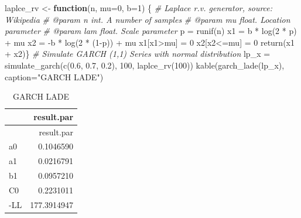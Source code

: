 \documentclass[
  11pt,
]{article}
\newenvironment{Shaded}{\begin{snugshade}}{\end{snugshade}}
\newcommand{\AttributeTok}[1]{\textcolor[rgb]{0.77,0.63,0.00}{#1}}
\newcommand{\CommentTok}[1]{\textcolor[rgb]{0.56,0.35,0.01}{\textit{#1}}}
\newcommand{\ControlFlowTok}[1]{\textcolor[rgb]{0.13,0.29,0.53}{\textbf{#1}}}
\newcommand{\DecValTok}[1]{\textcolor[rgb]{0.00,0.00,0.81}{#1}}
\newcommand{\FloatTok}[1]{\textcolor[rgb]{0.00,0.00,0.81}{#1}}
\newcommand{\FunctionTok}[1]{\textcolor[rgb]{0.00,0.00,0.00}{#1}}
\newcommand{\NormalTok}[1]{#1}
\newcommand{\OtherTok}[1]{\textcolor[rgb]{0.56,0.35,0.01}{#1}}
\newcommand{\SpecialCharTok}[1]{\textcolor[rgb]{0.00,0.00,0.00}{#1}}
\newcommand{\StringTok}[1]{\textcolor[rgb]{0.31,0.60,0.02}{#1}}
\begin{document}
\begin{Shaded}
\begin{Highlighting}[]
\NormalTok{laplce\_rv }\OtherTok{\textless{}{-}} \ControlFlowTok{function}\NormalTok{(n, }\AttributeTok{mu=}\DecValTok{0}\NormalTok{, }\AttributeTok{b=}\DecValTok{1}\NormalTok{) \{}
  \CommentTok{\#\textquotesingle{} Laplace r.v. generator, source: Wikipedia}
  \CommentTok{\#\textquotesingle{} @param n int. A number of samples}
  \CommentTok{\#\textquotesingle{} @param mu float. Location parameter}
  \CommentTok{\#\textquotesingle{} @param lam float. Scale parameter}
\NormalTok{  p }\OtherTok{=} \FunctionTok{runif}\NormalTok{(n)}
\NormalTok{  x1 }\OtherTok{=}\NormalTok{ b }\SpecialCharTok{*} \FunctionTok{log}\NormalTok{(}\DecValTok{2} \SpecialCharTok{*}\NormalTok{ p) }\SpecialCharTok{+}\NormalTok{ mu}
\NormalTok{  x2 }\OtherTok{=} \SpecialCharTok{{-}}\NormalTok{b }\SpecialCharTok{*} \FunctionTok{log}\NormalTok{(}\DecValTok{2} \SpecialCharTok{*}\NormalTok{ (}\DecValTok{1}\SpecialCharTok{{-}}\NormalTok{p)) }\SpecialCharTok{+}\NormalTok{ mu}
\NormalTok{  x1[x1}\SpecialCharTok{\textgreater{}}\NormalTok{mu] }\OtherTok{=} \DecValTok{0}
\NormalTok{  x2[x2}\SpecialCharTok{\textless{}=}\NormalTok{mu] }\OtherTok{=} \DecValTok{0}
  \FunctionTok{return}\NormalTok{(x1 }\SpecialCharTok{+}\NormalTok{ x2)\}}
\CommentTok{\# Simulate GARCH (1,1) Series with normal distribution}
\NormalTok{lp\_x }\OtherTok{=} \FunctionTok{simulate\_garch}\NormalTok{(}\FunctionTok{c}\NormalTok{(}\FloatTok{0.6}\NormalTok{, }\FloatTok{0.7}\NormalTok{, }\FloatTok{0.2}\NormalTok{), }\DecValTok{100}\NormalTok{, }\FunctionTok{laplce\_rv}\NormalTok{(}\DecValTok{100}\NormalTok{))}
\FunctionTok{kable}\NormalTok{(}\FunctionTok{garch\_lade}\NormalTok{(lp\_x), }\AttributeTok{caption=}\StringTok{"GARCH LADE"}\NormalTok{)}
\end{Highlighting}
\end{Shaded}

\begin{longtable}[]{@{}lr@{}}
\caption{GARCH LADE}\tabularnewline
\toprule
& result.par \\
\midrule
\endfirsthead
\toprule
& result.par \\
\midrule
\endhead
a0 & 0.1046590 \\
a1 & 0.0216791 \\
b1 & 0.0957210 \\
C0 & 0.2231011 \\
-LL & 177.3914947 \\
\bottomrule
\end{longtable}
\end{document}
